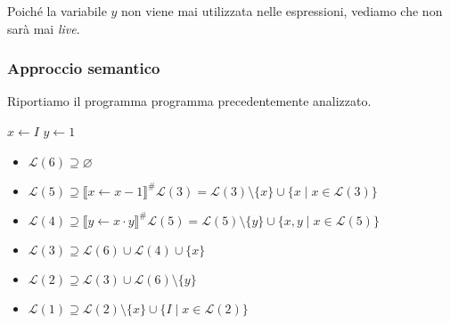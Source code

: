 Poiché la variabile $y$ non viene mai utilizzata nelle espressioni, vediamo che non sarà 
mai \textit{live}.

\subsubsection{Approccio semantico}

\begin{minipage}{0.5\textwidth}
    Riportiamo il programma programma precedentemente analizzato.

    \begin{algorithm}[H]
        $x \gets I$\;
        $y \gets 1$\;
    \end{algorithm}
\end{minipage}
\begin{minipage}{0.5\textwidth}
    \begin{figure}[H]
        \centering
    \end{figure}
\end{minipage}

\begin{itemize}
    \item $\mathcal{L}(6) \supseteq \varnothing$
    \item $\mathcal{L}(5) \supseteq \llbracket x \gets x - 1\rrbracket^\# \mathcal{L}(3)
    = \mathcal{L}(3) \setminus \{x\} \cup \{ x \mid x \in \mathcal{L}(3)\}$
    \item $\mathcal{L}(4) \supseteq \llbracket y \gets x \cdot y\rrbracket^\# \mathcal{L}(5)
    = \mathcal{L}(5) \setminus \{y\} \cup \{ x,y \mid x \in \mathcal{L}(5) \}$
    \item $\mathcal{L}(3) \supseteq \mathcal{L}(6) \cup \mathcal{L}(4)\cup \{x\}$
    \item $\mathcal{L}(2) \supseteq \mathcal{L}(3) \cup \mathcal{L}(6) \setminus \{y\}$
    \item $\mathcal{L}(1) \supseteq \mathcal{L}(2) \setminus \{x\} \cup \{I \mid x \in \mathcal{L}(2)\}$
\end{itemize}


